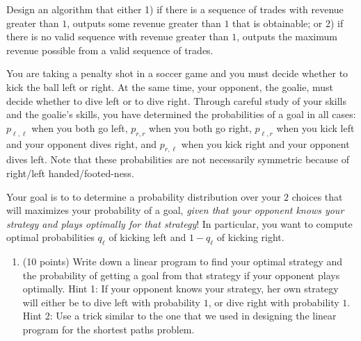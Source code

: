 \documentclass[11pt]{article}
\newcommand{\ans}[1]{ }
\begin{document}
\begin{enumerate}
\begin{enumerate}
Design an algorithm that either 1) if there is a sequence of trades with revenue greater than $1$, outputs some revenue greater than $1$ that is obtainable; or 2) if there is no valid sequence with revenue greater than $1$, outputs the maximum revenue possible from a valid sequence of trades.

\ans{Create a graph with a vertex for every commodity.  Let the weight of edge $u \rightarrow v$ equal $- \log R[u,v]$.  Let the weight of vertex $v$ equal $- \log (1-t_{v})$.  Now run modified Floyd Warshall with the recurrence in the previous problem to fill in all entries of the array.  Find the vertex $v$ that minimizes $dist(v,v,n)$; return $2^{-dist(v,v,n)}$}


\end{enumerate}




You are taking a penalty shot in a soccer game and you must decide whether to kick the ball left or right.  At the same time, your opponent, the goalie, must decide whether to dive left or to dive right.  Through careful study of your skills and the goalie's skills, you have determined the probabilities of a goal in all cases: $p_{\ell,\ell}$ when you both go left, $p_{r,r}$ when you both go right, $p_{\ell,r}$ when you kick left and your opponent dives right, and $p_{r,\ell}$ when you kick right and your opponent dives left.  Note that these probabilities are not necessarily symmetric because of right/left handed/footed-ness.

Your goal is to to determine a probability distribution over your $2$ choices that will maximizes your probability of a goal,  \emph{given that your opponent knows your strategy and plays optimally for that strategy}!  In particular, you want to compute optimal probabilities $q_{\ell}$ of kicking left and $1-q_{\ell}$ of kicking right.

\begin{enumerate}

\item (10 points) Write down a linear program to find your optimal strategy and the probability of getting a goal from that strategy if your opponent plays optimally.  Hint 1: If your opponent knows your strategy, her own strategy will either be to dive left with probability $1$, or dive right with probability $1$.   Hint 2: Use a trick similar to the one that we used in designing the linear program for the shortest paths problem.  
\ans{
Maximize w\\
Subject to:\\
$$ 0 \leq q_{\ell} \leq 1$$
$$ w \leq q_{\ell}p_{\ell,\ell} + (1-q_{\ell})p_{r,\ell}$$ %
$$ w \leq q_{\ell}p_{\ell,r} + (1-q_{\ell})p_{r,r}$$ %
}


\end{enumerate}
\end{enumerate}
\end{document}
